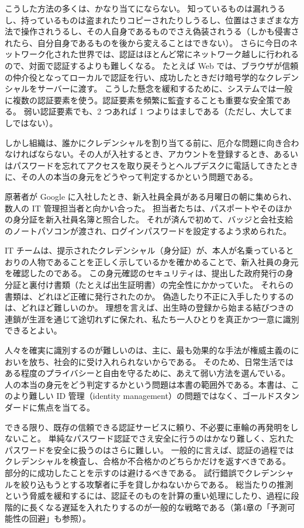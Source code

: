 \documentclass[uplatex]{jsarticle}
\def\label#1{}%
\begin{document}
こうした方法の多くは、かなり当てにならない。
知っているものは漏れうるし、持っているものは盗まれたりコピーされたりしうるし、位置はさまざまな方法で操作されうるし、その人自身であるものでさえ偽装されうる（しかも侵害されたら、自分自身であるものを後から変えることはできない）。
さらに今日のネットワーク化された世界では、認証はほとんど常にネットワーク越しに行われるので、対面で認証するよりも難しくなる。
たとえば Web では、ブラウザが信頼の仲介役となってローカルで認証を行い、成功したときだけ暗号学的なクレデンシャルをサーバーに渡す。
こうした懸念を緩和するために、システムでは一般に複数の認証要素を使う。認証要素を頻繁に監査することも重要な安全策である。
弱い認証要素でも、2 つあれば 1 つよりはましである（ただし、大してましではない）。

しかし組織は、誰かにクレデンシャルを割り当てる前に、厄介な問題に向き合わなければならない。その人が入社するとき、アカウントを登録するとき、あるいはパスワードを忘れてアクセスを取り戻そうとヘルプデスクに電話してきたときに、その人の本当の身元をどうやって判定するかという問題である。

\begin{exa}\label{exa:ch1-google-onboarding}
原著者が Google に入社したとき、新入社員全員がある月曜日の朝に集められ、数人の IT 管理担当者と向かい合った。
担当者たちは、パスポートやそのほかの身分証を新入社員名簿と照合した。
それが済んで初めて、バッジと会社支給のノートパソコンが渡され、ログインパスワードを設定するよう求められた。

IT チームは、提示されたクレデンシャル（身分証）が、本人が名乗っているとおりの人物であることを正しく示しているかを確かめることで、新入社員の身元を確認したのである。
この身元確認のセキュリティは、提出した政府発行の身分証と裏付け書類（たとえば出生証明書）の完全性にかかっていた。
それらの書類は、どれほど正確に発行されたのか。
偽造したり不正に入手したりするのは、どれほど難しいのか。
理想を言えば、出生時の登録から始まる結びつきの連鎖が生涯を通じて途切れずに保たれ、私たち一人ひとりを真正かつ一意に識別できるとよい。
\end{exa}

人々を確実に識別するのが難しいのは、主に、最も効果的な手法が権威主義のにおいを放ち、社会的に受け入れられないからである。
そのため、日常生活ではある程度のプライバシーと自由を守るために、あえて弱い方法を選んでいる。
人の本当の身元をどう判定するかという問題は本書の範囲外である。本書は、このより難しい ID 管理（identity management）の問題ではなく、ゴールドスタンダードに焦点を当てる。

できる限り、既存の信頼できる認証サービスに頼り、不必要に車輪の再発明をしないこと。
単純なパスワード認証でさえ安全に行うのはかなり難しく、忘れたパスワードを安全に扱うのはさらに難しい。
一般的に言えば、認証の過程ではクレデンシャルを検査し、合格か不合格かのどちらかだけを返すべきである。
部分的に成功したことを示すのは避けるべきである。
試行錯誤でクレデンシャルを絞り込もうとする攻撃者に手を貸しかねないからである。
総当たりの推測という脅威を緩和するには、認証そのものを計算の重い処理にしたり、過程に段階的に長くなる遅延を入れたりするのが一般的な戦略である（第4章の「予測可能性の回避」も参照）。
\end{document}
